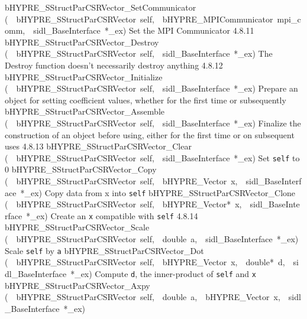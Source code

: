 \documentclass{article}
\begin{document}
\begin{cxxentry}
\begin{cxxentry}
\begin{cxxnames}
        {bHYPRE\_SStructParCSRVector\_SetCommunicator}
        {(\ \ bHYPRE\_SStructParCSRVector\ self,\ \ bHYPRE\_MPICommunicator\ mpi\_comm,\ \ sidl\_BaseInterface\ *\_ex)}
        {
Set the MPI Communicator}
        {4.8.11}
        {bHYPRE\_SStructParCSRVector\_Destroy}
        {(\ \ bHYPRE\_SStructParCSRVector\ self,\ \ sidl\_BaseInterface\ *\_ex)}
        {
The Destroy function doesn't necessarily destroy anything}
        {4.8.12}
        {bHYPRE\_SStructParCSRVector\_Initialize}
        {(\ \ bHYPRE\_SStructParCSRVector\ self,\ \ sidl\_BaseInterface\ *\_ex)}
        {
Prepare an object for setting coefficient values, whether for
the first time or subsequently}
        {}
\label{cxx.4.8.23}
        {bHYPRE\_SStructParCSRVector\_Assemble}
        {(\ \ bHYPRE\_SStructParCSRVector\ self,\ \ sidl\_BaseInterface\ *\_ex)}
        {
Finalize the construction of an object before using, either
for the first time or on subsequent uses}
        {4.8.13}
        {bHYPRE\_SStructParCSRVector\_Clear}
        {(\ \ bHYPRE\_SStructParCSRVector\ self,\ \ sidl\_BaseInterface\ *\_ex)}
        {
Set {\tt self} to 0}
        {}
\label{cxx.4.8.24}
        {bHYPRE\_SStructParCSRVector\_Copy}
        {(\ \ bHYPRE\_SStructParCSRVector\ self,\ \ bHYPRE\_Vector\ x,\ \ sidl\_BaseInterface\ *\_ex)}
        {
Copy data from x into {\tt self}}
        {}
\label{cxx.4.8.25}
        {bHYPRE\_SStructParCSRVector\_Clone}
        {(\ \ bHYPRE\_SStructParCSRVector\ self,\ \ bHYPRE\_Vector*\ x,\ \ sidl\_BaseInterface\ *\_ex)}
        {
Create an {\tt x} compatible with {\tt self}}
        {4.8.14}
        {bHYPRE\_SStructParCSRVector\_Scale}
        {(\ \ bHYPRE\_SStructParCSRVector\ self,\ \ double\ a,\ \ sidl\_BaseInterface\ *\_ex)}
        {
Scale {\tt self} by {\tt a}}
        {}
\label{cxx.4.8.26}
        {bHYPRE\_SStructParCSRVector\_Dot}
        {(\ \ bHYPRE\_SStructParCSRVector\ self,\ \ bHYPRE\_Vector\ x,\ \ double*\ d,\ \ sidl\_BaseInterface\ *\_ex)}
        {
Compute {\tt d}, the inner-product of {\tt self} and {\tt x}}
        {}
\label{cxx.4.8.27}
        {bHYPRE\_SStructParCSRVector\_Axpy}
        {(\ \ bHYPRE\_SStructParCSRVector\ self,\ \ double\ a,\ \ bHYPRE\_Vector\ x,\ \ sidl\_BaseInterface\ *\_ex)}

\end{cxxnames}
\end{cxxentry}
\end{cxxentry}
\end{document}
